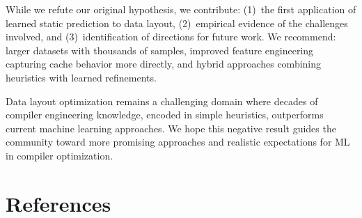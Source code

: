 \documentclass{article}
\begin{document}
While we refute our original hypothesis, we contribute: (1)~the first application of learned static prediction to data layout, (2)~empirical evidence of the challenges involved, and (3)~identification of directions for future work. We recommend: larger datasets with thousands of samples, improved feature engineering capturing cache behavior more directly, and hybrid approaches combining heuristics with learned refinements.

Data layout optimization remains a challenging domain where decades of compiler engineering knowledge, encoded in simple heuristics, outperforms current machine learning approaches. We hope this negative result guides the community toward more promising approaches and realistic expectations for ML in compiler optimization.

\section*{References}
\end{document}

